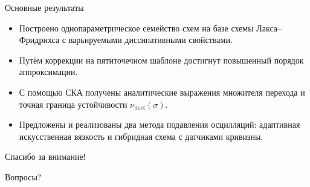 \documentclass[12pt, aspectratio=169]{beamer}
\begin{document}



\begin{frame}{Основные результаты}
\begin{itemize}
\item Построено однопараметрическое семейство схем на базе схемы Лакса--Фридрихса с варьируемыми диссипативными свойствами.
\item Путём коррекции на пятиточечном шаблоне достигнут повышенный порядок аппроксимации.
\item С помощью СКА получены аналитические выражения множителя перехода и точная граница устойчивости $\nu_{\max}(\sigma)$.
\item Предложены и реализованы два метода подавления осцилляций: адаптивная искусственная вязкость и гибридная схема с датчиками кривизны.
\end{itemize}
\end{frame}


\begin{frame}
\centering
\Large
Спасибо за внимание!

\bigskip

Вопросы?
\end{frame}
\end{document}

